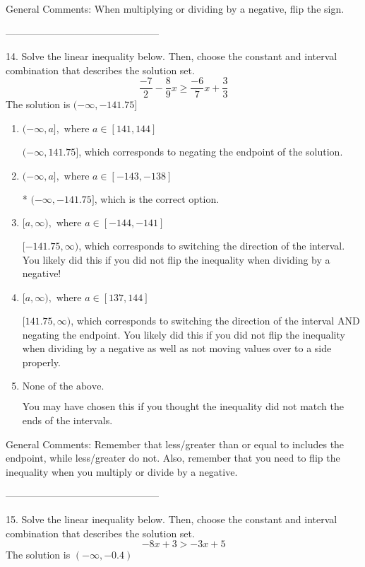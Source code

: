 \documentclass{article}[14pt]
\begin{document}
General Comments: When multiplying or dividing by a negative, flip the sign.

-----------------------------------------------

14. Solve the linear inequality below. Then, choose the constant and interval combination that describes the solution set.
$$ \frac{-7}{2} - \frac{8}{9} x \geq \frac{-6}{7} x + \frac{3}{3} $$ 
The solution is $ (-\infty, -141.75] $ 

\begin{enumerate}[label=\Alph*.] 
\item $ (-\infty, a], \text{ where } a \in [141, 144] $ 

  $(-\infty, 141.75]$, which corresponds to negating the endpoint of the solution. 
\item $ (-\infty, a], \text{ where } a \in [-143, -138] $ 

 * $(-\infty, -141.75]$, which is the correct option. 
\item $ [a, \infty), \text{ where } a \in [-144, -141] $ 

  $[-141.75, \infty)$, which corresponds to switching the direction of the interval. You likely did this if you did not flip the inequality when dividing by a negative! 
\item $ [a, \infty), \text{ where } a \in [137, 144] $ 

  $[141.75, \infty)$, which corresponds to switching the direction of the interval AND negating the endpoint. You likely did this if you did not flip the inequality when dividing by a negative as well as not moving values over to a side properly. 
\item $ \text{None of the above}. $ 

 You may have chosen this if you thought the inequality did not match the ends of the intervals. 
\end{enumerate} 
 
General Comments: Remember that less/greater than or equal to includes the endpoint, while less/greater do not. Also, remember that you need to flip the inequality when you multiply or divide by a negative.

-----------------------------------------------

15. Solve the linear inequality below. Then, choose the constant and interval combination that describes the solution set.
$$ -8x + 3 > -3x + 5 $$ 
The solution is $ (-\infty, -0.4) $ 
\end{document}

